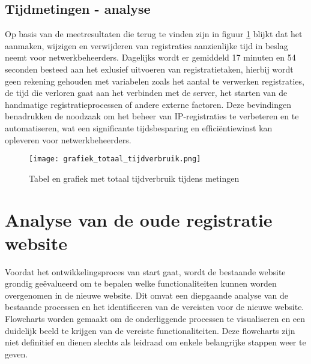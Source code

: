 \subsection{Tijdmetingen - analyse}
Op basis van de meetresultaten die terug te vinden zijn in figuur \ref{fig:tijdverbruik_metingen} blijkt dat het aanmaken, wijzigen en verwijderen van registraties aanzienlijke tijd in beslag neemt voor netwerkbeheerders. Dagelijks wordt er gemiddeld 17 minuten en 54 seconden besteed aan het exlusief uitvoeren van registratietaken, hierbij wordt geen rekening gehouden met variabelen zoals het aantal te verwerken registraties, de tijd die verloren gaat aan het verbinden met de server, het starten van de handmatige registratieprocessen of andere externe factoren. Deze bevindingen benadrukken de noodzaak om het beheer van IP-registraties te verbeteren en te automatiseren, wat een significante tijdsbesparing en efficiëntiewinst kan opleveren voor netwerkbeheerders.

\begin{figure}[H]
    \texttt{[image: grafiek\_totaal\_tijdverbruik.png]}
    \caption{Tabel en grafiek met totaal tijdverbruik tijdens metingen}
    \label{fig:tijdverbruik_metingen}
\end{figure}

\section{Analyse van de oude registratie website}
Voordat het ontwikkelingsproces van start gaat, wordt de bestaande website grondig geëvalueerd om te bepalen welke functionaliteiten kunnen worden overgenomen in de nieuwe website. Dit omvat een diepgaande analyse van de bestaande processen en het identificeren van de vereisten voor de nieuwe website. Flowcharts worden gemaakt om de onderliggende processen te visualiseren en een duidelijk beeld te krijgen van de vereiste functionaliteiten. Deze flowcharts zijn niet definitief en dienen slechts als leidraad om enkele belangrijke stappen weer te geven.


